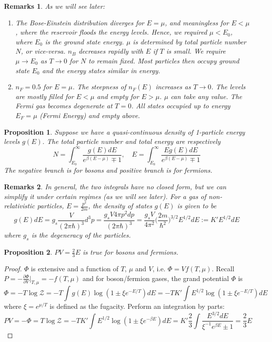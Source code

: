 \documentclass[a4paper]{article}
\newtheorem{remarks}{Remarks}[section]
\theoremstyle{new}
\newtheorem{prop}{Proposition}[section]
\begin{document}
\begin{remarks}
As we will see later:
\begin{enumerate}
    \item The Bose-Einstein distribution diverges for $E=\mu$, and meaningless for $E<\mu$, where the reservoir floods the energy levels. Hence, we required $\mu<E_0$, where $E_0$ is the ground state energy. $\mu$ is determined by total particle number $N$, or vice-versa. $n_B$ decreases rapidly with $E$ if $T$ is small. We require $\mu\rightarrow E_0$ as $T\rightarrow 0$ for $N$ to remain fixed. Most particles then occupy ground state $E_0$ and the energy states similar in energy. 
    \item $n_F=0.5$ for $E=\mu$. The steepness of $n_F(E)$ increases as $T\rightarrow 0$. The levels are mostly filled for $E<\mu$ and empty for $E>\mu$. $\mu$ can take any value. The Fermi gas becomes degenerate at $T=0$. All states occupied up to energy $E_F=\mu$ (Fermi Energy) and empty above.
\end{enumerate}
\end{remarks}
\begin{prop}
Suppose we have a quasi-continuous density of 1-particle energy levels $g(E)$. The total particle number and total energy are respectively
$$N=\int_{E_{0}}^\infty\frac{g(E)dE}{e^{\beta(E-\mu)}\mp 1},\quad E=\int_{E_{0}}^\infty\frac{E g(E)dE}{e^{\beta(E-\mu)}\mp 1}$$
The negative branch is for bosons and positive branch is for fermions. 
\end{prop}
\begin{remarks}
In general, the two integrals have no closed form, but we can simplify it under certain regimes (as we will see later). For a gas of non-relativistic particles, $E=\frac{p^2}{2m}$, the density of states $g(E)$ is given to be
$$g(E)dE=g_s\frac{V}{(2\pi\hbar)^3}d^3p=\frac{g_sV4\pi p^2dp}{(2\pi\hbar)^3}=\frac{g_sV}{4\pi^2}\bigg(\frac{2m}{\hbar^2}\bigg)^{3/2}E^{1/2}dE:=K'E^{1/2}dE$$
where $g_s$ is the degeneracy of the particles.
\end{remarks} 
\begin{prop}
$PV=\frac{2}{3}E$ is true for bosons and fermions.
\end{prop}
\begin{proof}
$\Phi$ is extensive and a function of $T$, $\mu$ and $V$, i.e. $\Phi=Vf(T,\mu)$. Recall $P=-\frac{\partial\Phi}{\partial V}|_{T,\mu}=-f(T,\mu)$ and for boson/fermion gases, the grand potential $\Phi$ is
$$\Phi=-T\log\mathcal{Z}=-T\int g(E)\log(1\pm\xi e^{-E/T})dE=-TK'\int E^{1/2}\log(1\pm\xi e^{-E/T})dE$$
where $\xi=e^{\mu/T}$ is defined as the fugacity. Perform an integration by parts:
$$PV=-\Phi=T\log\mathcal{Z}=-TK'\int E^{1/2}\log(1\pm\xi e^{-\beta E})dE=K'\frac{2}{3}\int\frac{E^{3/2}dE}{\xi^{-1}e^{\beta E}\pm1}=\frac{2}{3}E$$
\end{proof}
\end{document}
